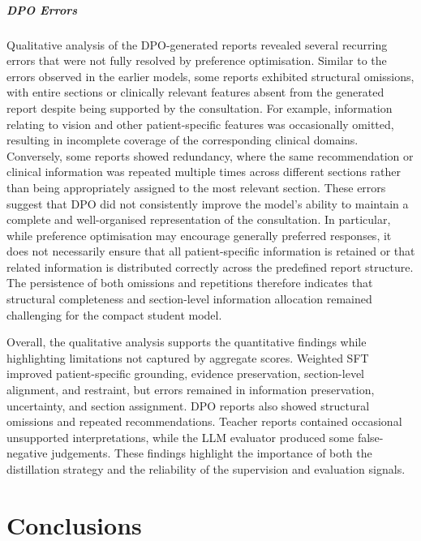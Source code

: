 \documentclass[ %
                    author={Aman Kumar Singh},
                supervisor={Dr. Edwin Simpson},
                    degree={MSc},
                     title={Quality-Aware Knowledge Distillation of Large Language Models for Efficient Personalised Clinical Report Generation},
                  subtitle={},
                      type={},
                      year={2021}]{dissertation}
\begin{document}
\paragraph{DPO Errors}
Qualitative analysis of the DPO-generated reports revealed several recurring
errors that were not fully resolved by preference optimisation. Similar to
the errors observed in the earlier models, some reports exhibited structural
omissions, with entire sections or clinically relevant features absent from
the generated report despite being supported by the consultation. For
example, information relating to vision and other patient-specific features
was occasionally omitted, resulting in incomplete coverage of the
corresponding clinical domains. Conversely, some reports showed redundancy,
where the same recommendation or clinical information was repeated multiple
times across different sections rather than being appropriately assigned to
the most relevant section. These errors suggest that DPO did not consistently
improve the model's ability to maintain a complete and well-organised
representation of the consultation. In particular, while preference
optimisation may encourage generally preferred responses, it does not
necessarily ensure that all patient-specific information is retained or that
related information is distributed correctly across the predefined report
structure. The persistence of both omissions and repetitions therefore
indicates that structural completeness and section-level information
allocation remained challenging for the compact student model.

Overall, the qualitative analysis supports the quantitative findings while
highlighting limitations not captured by aggregate scores. Weighted SFT
improved patient-specific grounding, evidence preservation, section-level
alignment, and restraint, but errors remained in information preservation,
uncertainty, and section assignment. DPO reports also showed structural
omissions and repeated recommendations. Teacher reports contained occasional
unsupported interpretations, while the LLM evaluator produced some
false-negative judgements. These findings highlight the importance of both
the distillation strategy and the reliability of the supervision and
evaluation signals.
\chapter{Conclusions}
\label{chap:Discussion}
\end{document}
